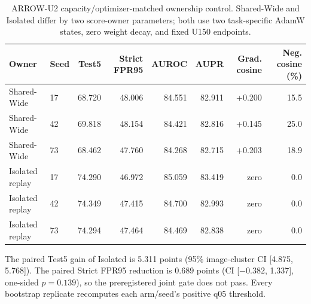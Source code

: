 \begin{table}[t]
\centering
\caption{ARROW-U2 capacity/optimizer-matched ownership control. Shared-Wide and
Isolated differ by two score-owner parameters; both use two task-specific
AdamW states, zero weight decay, and fixed U150 endpoints.}
\label{tab:supp-arrow-capacity}
\scriptsize
\setlength{\tabcolsep}{4pt}
\begin{tabular}{llrrrrrr}\toprule
Owner & Seed & Test5 & Strict FPR95 & AUROC & AUPR & Grad. cosine & Neg. cosine (\%)\\\midrule
Shared-Wide & 17 & 68.720 & 48.006 & 84.551 & 82.911 & +0.200 & 15.5 \\
Shared-Wide & 42 & 69.818 & 48.154 & 84.421 & 82.816 & +0.145 & 25.0 \\
Shared-Wide & 73 & 68.462 & 47.760 & 84.268 & 82.715 & +0.203 & 18.9 \\
Isolated replay & 17 & 74.290 & 46.972 & 85.059 & 83.419 & zero & 0.0 \\
Isolated replay & 42 & 74.349 & 47.415 & 84.700 & 82.993 & zero & 0.0 \\
Isolated replay & 73 & 74.294 & 47.464 & 84.469 & 82.838 & zero & 0.0 \\
\bottomrule\end{tabular}
\parbox{0.98\textwidth}{\scriptsize The paired Test5 gain of Isolated is
5.311 points (95\% image-cluster CI [4.875, 5.768]).  The paired Strict
FPR95 reduction is 0.689 points (CI [$-0.382$, 1.337], one-sided
$p=0.139$), so the preregistered joint gate does not pass.  Every bootstrap
replicate recomputes each arm/seed's positive q05 threshold.}
\end{table}
